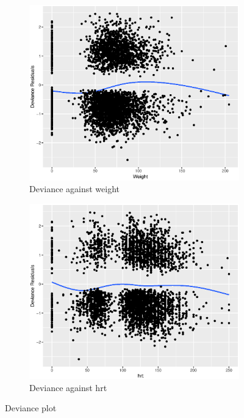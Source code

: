\documentclass{article}
\begin{document}
\begin{figure}[!htb]
    \centering
	\begin{subfigure}[b]{0.5\textwidth}
	\includegraphics[width = \textwidth]{weight.eps}
	\caption{Deviance against weight}
	\end{subfigure}%
	\begin{subfigure}[b]{0.5\textwidth}
	\includegraphics[width = \textwidth]{hrt.eps}
	\caption{Deviance against hrt}
	\end{subfigure}
	\caption{Deviance plot}
	\label{devp}
\end{figure}	
\end{document}
